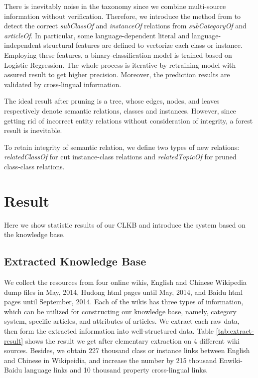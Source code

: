 \documentclass[runningheads,a4paper]{llncs}
\begin{document}
There is inevitably noise in the taxonomy since we combine multi-source information without verification. Therefore, we introduce the method from \cite{wang2014cross} to detect the correct \textit{subClassOf} and \textit{instanceOf} relations from \textit{subCategoryOf} and \textit{articleOf}. %
In particular, some language-dependent literal and language-independent structural features are defined to vectorize each class or instance. Employing these features, a binary-classification model is trained based on Logistic Regression. The whole process is iterative by retraining model with assured result to get higher precision. Moreover, the prediction results are validated by cross-lingual information.

The ideal result after pruning is a tree, whose edges, nodes, and leaves respectively denote semantic relations, classes and instances. However, since getting rid of incorrect entity relations without consideration of integrity, a forest result is inevitable.

To retain integrity of semantic relation, we define two types of new relations: \textit{relatedClassOf} for cut instance-class relations and \textit{relatedTopicOf} for pruned class-class relations. 

\section{Result}
\label{sec:result}
Here we show statistic results of our CLKB and introduce the system based on the knowledge base.

\subsection{Extracted Knowledge Base}
We collect the resources from four online wikis, English and Chinese Wikipedia dump files in May, 2014, Hudong html pages until May, 2014, and Baidu html pages until September, 2014. Each of the wikis has three types of information, which can be utilized for constructing our knowledge base, namely, category system, specific articles, and attributes of articles. We extract each raw data, then form the extracted information into well-structured data. Table \ref{tab:extract-result} shows the result we get after elementary extraction on 4 different wiki sources. Besides, we obtain 227 thousand class or instance links between English and Chinese in Wikipeidia, and increase the number by 215 thousand Enwiki-Baidu language links and 10 thousand property cross-lingual links.
\end{document}
